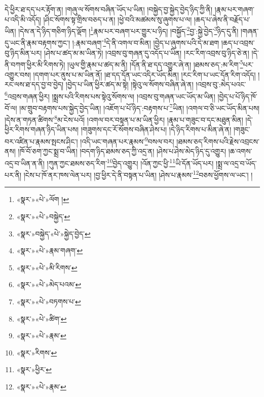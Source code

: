 དེ་ཕྱིར་ཐ་དད་པར་རྟོག་ན། །གཞུ་ལ་སོགས་བཞིན་ཡོད་པ་ཡིན། །བསྐྱེད་བྱ་སྐྱེད་བྱེད་ཉིད་ཀྱི་ནི། །རྣམ་པར་གཞག་པ་འདི་མི་འདོད། །ཤིང་སོགས་སྟ་གྲིས་བཅད་པ་ན། །ཕྱེ་བའི་མཚམས་སུ་ཞུགས་པ་ལ། །ཆད་པ་ཞེས་ནི་བརྗོད་པ་ཡིན། །དེས་ན་དེ་ཉིད་གཅིག་ཉིད་ལྡོག །\footnote{«སྣར་»«པེ་»ལོག །}རྣམ་པར་བཞག་པར་གྱུར་པ་ཉིད། །བསྐྱོད་\footnote{«སྣར་»«པེ་»བསྐྱེད་}བྱ་:སྐྱེ་བྱེད་\footnote{«སྣར་»བསྐྱེད་«པེ་»སྐྱེད་བྱེད་}ཉིད་དུ་ནི། །གཞན་དུ་ཡང་ནི་རྣམ་བརྟགས་ཀྱང་། །:རྣམ་བཞག་\footnote{«སྣར་»«པེ་»རྣམ་གཞག་}དེ་ནི་འགལ་བ་མིན། །བྱེད་པ་ཞུགས་པའི་དེ་མ་ཐག །ཆད་པ་འབྲས་བུ་ཉིད་མིན་པར། །ཤེས་པ་ཚད་མ་མ་ཡིན་ཏེ། །འབྲས་བུ་གཞན་དུ་འདོད་པ་ཡིན། །རང་རིག་འབྲས་བུ་ཉིད་ཅེ་ན། །དེ་ནི་བཀག་ཕྱིར་མི་རིགས་ཏེ། །ཡུལ་གྱི་རྣམ་པ་ཚད་མ་ནི། །དོན་ནི་ཐ་དད་འགྱུར་ཞེ་ན། །ཐམས་ཅད་:མ་རིག་\footnote{«སྣར་»«པེ་»མི་རིགས་}པར་འགྱུར་བས། །དགག་པར་ནུས་པ་མ་ཡིན་ནོ། །ཐ་དད་དོན་ཡང་འདིར་ཡོད་མིན། །རང་རིག་པ་ཡང་དོན་རིག་འདོད། །རང་ལས་ཐ་དད་བྱ་བ་བྱེད། །བྱེད་པ་ཡིན་ཕྱིར་ཚད་མ་སྟེ། །སྟེའུ་ལ་སོགས་བཞིན་ཞེ་ན། །འབྲས་བུ་:མེད་པའང་\footnote{«སྣར་»«པེ་»མེད་པའམ་}འབྲས་གཞན་ཕྱིར། །སྨྲས་པའི་རིགས་པས་སྟེའུ་སོགས་ལ། །འབྲས་བུ་གཞན་ཡང་ཡོད་མ་ཡིན། །བྱེད་པ་པོ་ཉིད་ཁོ་བོ་ལ། །མ་གྲུབ་བརྟགས་པས་སྐྱེད་བྱེད་ཡིན། །འཇོག་པ་པོ་ཉིད་:བརྟགས་པ་\footnote{«སྣར་»«པེ་»བཏགས་པ་}ཡིན། །འགལ་བ་ཅི་ཡང་ཡོད་མིན་པས། །དེས་ན་གཏན་ཚིགས་\footnote{«སྣར་»«པེ་»ཚིག་}མ་ངེས་པའོ། །འགལ་བར་བསྟན་པ་མ་ཡིན་ཕྱིར། །རྣམ་པ་གཟུང་བ་དང་མཐུན་མིན། །དེ་ཕྱིར་རིགས་གཞན་ཉིད་ཡིན་པས། །གཟུགས་དང་རོ་སོགས་བཞིན་ཤེས་པ། །དེ་ཉིད་རིགས་པ་མིན་ཞེ་ན། །གཟུང་བར་འཛིན་པ་རྣམས་སྤངས་ཤིང་། །འདི་ཡང་གཞན་པར་རྣམས་\footnote{«སྣར་»«པེ་»རྣམ་}བསལ་བར། །ཐམས་ཅད་རིགས་པའི་རྗེས་འབྲངས་ནས། །ཁོ་བོ་ཅག་ཀྱང་སྨྲ་བ་ཡིན། །བདག་ཉིད་ཐམས་ཅད་ཀྱི་འདྲ་ན། །ཤེས་པ་ཤེས་མེད་ཉིད་དུ་འགྱུར། །ཆ་འགས་འདྲ་བ་ཡིན་ན་ནི། །ཀུན་ཀྱང་ཐམས་ཅད་རིག་\footnote{«སྣར་»རིགས་}བྱེད་འགྱུར། །འོན་ཀྱང་ཕྱི་\footnote{«སྣར་»ཕྱིར་}ཡི་དོན་ཡོད་པར། །སྨྲ་ལ་འདྲ་བ་ཡོད་པར་ནི། །ངེས་པ་ཁོ་ནར་ཁས་ལེན་པར། །བྱ་ཕྱིར་དེ་ནི་བསྟན་པ་ཡིན། །ཤེས་པ་རྣམས་\footnote{«སྣར་»«པེ་»རྣམ་}བཅས་ཕྱོགས་ལ་ཡང་། །
